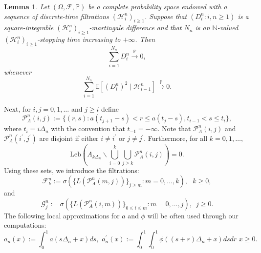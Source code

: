 \documentclass{article}
\theoremstyle{plain}
\newtheorem{lemma}{Lemma}
\theoremstyle{definition}
\theoremstyle{remark}
\begin{document}
\begin{appendix}
\begin{lemma}\label{lemmapproxgammahat-1}Let $(\Omega,\mathscr{F},\mathbb{P})$
	be a complete probability space endowed with a sequence of discrete-time
	filtrations $(\mathscr{H}_{i}^{n})_{i\geq1}$. Suppose that $(D_{i}^{n}:i,n\geq1)$
	is a square-integrable $(\mathscr{H}_{i}^{n})_{i\geq1}$-martingale
	difference and that $N_{n}$ is an $\mathbb{N}$-valued $(\mathscr{H}_{i}^{n})_{i\geq1}$-stopping
	time increasing to $+\infty$. Then 
	\[
	\sum_{i=1}^{N_{n}}D_{i}^{n}\overset{\mathbb{P}}{\rightarrow}0,
	\]
	whenever 
	\[
	\sum_{i=1}^{N_{n}}\mathbb{E}\left[(D_{i}^{n})^{2}\mid\mathscr{H}_{i-1}^{n}\right]\overset{\mathbb{P}}{\rightarrow}0.
	\]
	
\end{lemma}


Next, for $i,j=0,1,\ldots$ and $j\geq i$ define
\begin{equation}
	\mathcal{P}_{A}^{n}(i,j):=\{(r,s):a(t_{j+1}-s)<r\leq a(t_{j}-s),t_{i-1}<s\leq t_{i}\},\label{Pijsetdef}
\end{equation}
where $t_{i}=i\Delta_{n}$ with the convention that $t_{-1}=-\infty$. Note that $\mathcal{P}_{A}^{n}(i,j)$ and $\mathcal{P}_{A}^{n}(i^{\prime},j^{\prime})$ are disjoint if either $i\neq i^{\prime}$ or $j\neq j^{\prime}$. Furthermore, for all $k=0,1,\ldots,$
\begin{equation}
\mathrm{Leb}(A_{k\Delta_n}\backslash\bigcup_{i=0}^{k}\bigcup_{j\geq k}\mathcal{P}_{A}^{n}(i,j))=0. \label{eq:reprA_slices}
\end{equation}
Using these sets, we introduce the filtrations: 
\begin{equation}
	\mathscr{F}_{k}^{n}  :=\sigma\left(\{L(\mathcal{P}_{A}^{n}(m,j))\}_{j\geq m}:m=0,\ldots,k\right),\,\,\,\,k\geq0,\label{filtrationovertime}
\end{equation}
and
\begin{equation}
	\mathscr{G}_{j}^{n}:=\sigma\left(\{L(\mathcal{P}_{A}^{n}(i,m))\}_{0\leq i\leq m}:m=0,\ldots,j\right),\,\,\,j\geq0.\label{filtrationoverspace}
\end{equation}
The following local approximations for $a$ and $\phi$ will
be often used through our computations:
\begin{equation}
	a_{n}(x):=\int_{0}^{1}a(s\Delta_{n}+x)ds,\,\,a_{n}^{\prime}(x):=\int_{0}^{1}\int_{0}^{1}\phi((s+r)\Delta_{n}+x)dsdr\,\,x\geq0.\label{phiapprox}
\end{equation}


\end{appendix}
\end{document}
